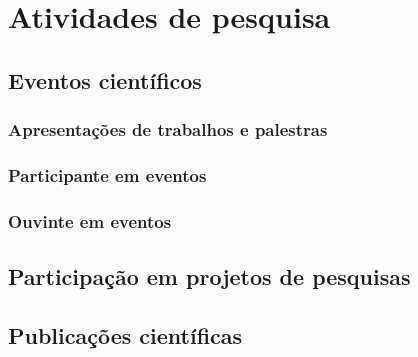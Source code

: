 
\chapter{Atividades de pesquisa}\label{cap:pesquisa}

\section{Eventos científicos} \label{sec:eventosCientificos}

\subsection{Apresentações de trabalhos e palestras}



\subsection{Participante em eventos}



\subsection{Ouvinte em eventos}






\section{Participação em projetos de pesquisas}



\section{Publicações científicas}

